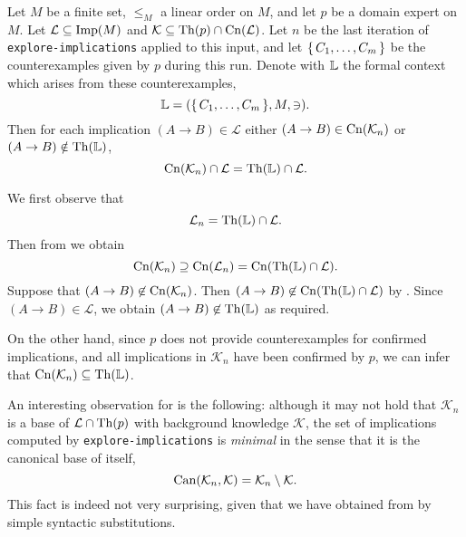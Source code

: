 \begin{Theorem}
  \label{thm:explore-implications-counterexamples-context}
  Let $M$ be a finite set, $\leq_{M}$ a linear order on $M$, and let $p$ be a domain
  expert on $M$. Let $\mathcal{L} \subseteq \operatorname{Imp}(M)$ and $\mathcal{K} \subseteq \operatorname{Th}(p)
  \cap \operatorname{Cn}(\mathcal{L})$.  Let $n$ be the last iteration of
  \lstinline{explore-implications} applied to this input, and let ${\{\, C_{1}, \dots,
    C_{m} \,\}}$ be the counterexamples given by $p$ during this run.  Denote with ${\mathbb{L}}$
  the formal context which arises from these counterexamples, \ie
  \begin{equation*}
    {\ensuremath{\mathbb{L}}} = ({\{\, C_{1}, \dots, C_{m} \,\}}, M, \ni).
  \end{equation*}
  Then for each implication $(A \to B) \in \mathcal{L}$ either $(A \to B) \in
  \operatorname{Cn}(\mathcal{K}_{n})$ or $(A \to B) \notin \operatorname{Th}({\mathbb{L}})$, \ie
  \begin{equation*}
    \operatorname{Cn}(\mathcal{K}_{n}) \cap \mathcal{L} = \operatorname{Th}({\mathbb{L}}) \cap \mathcal{L}.
  \end{equation*}
\end{Theorem}
\begin{Proof}
  We first observe that
  \begin{equation}
    \label{eq:40}
    \mathcal{L}_{n} = \operatorname{Th}({\mathbb{L}}) \cap \mathcal{L}.
  \end{equation}
  Then from  we obtain
  \begin{equation}
    \label{eq:37}
    \operatorname{Cn}(\mathcal{K}_{n}) \supseteq \operatorname{Cn}(\mathcal{L}_{n}) = \operatorname{Cn}(\operatorname{Th}({\mathbb{L}}) \cap \mathcal{L}).
  \end{equation}
  Suppose that $(A \to B) \not\in \operatorname{Cn}(\mathcal{K}_{n})$.  Then $(A \to B) \not\in
  \operatorname{Cn}(\operatorname{Th}({\mathbb{L}}) \cap \mathcal{L})$ by .  Since $(A \to B) \in \mathcal{L}$,
  we obtain $(A \to B) \not\in \operatorname{Th}({\mathbb{L}})$ as required.

  On the other hand, since $p$ does not provide counterexamples for confirmed
  implications, and all implications in $\mathcal{K}_{n}$ have been confirmed by $p$, we
  can infer that $\operatorname{Cn}(\mathcal{K}_{n}) \subseteq \operatorname{Th}({\mathbb{L}})$.
\end{Proof}

An interesting observation for  is the following: although
it may not hold that $\mathcal{K}_{n}$ is a base of $\mathcal{L} \cap \operatorname{Th}(p)$ with
background knowledge $\mathcal{K}$, the set of implications computed by
\lstinline{explore-implications} is \emph{minimal} in the sense that it is the canonical
base of itself, \ie
\begin{equation*}
  \operatorname{Can}(\mathcal{K}_{n}, \mathcal{K}) = \mathcal{K}_{n} \setminus \mathcal{K}.
\end{equation*}
This fact is indeed not very surprising, given that we have obtained
 from
 by simple syntactic
substitutions.

